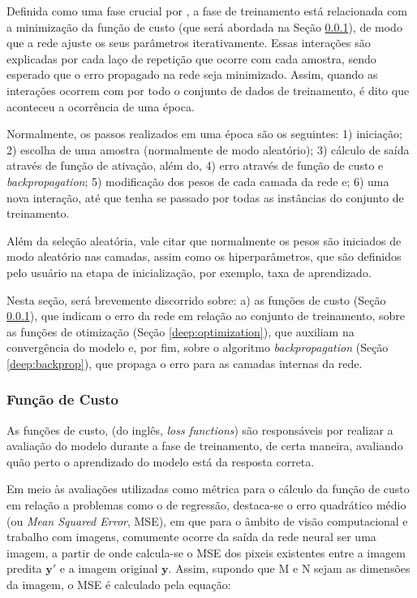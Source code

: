 Definida como uma fase crucial por \cite{ponti2018funciona}, a fase de treinamento está relacionada com a minimização da função de custo (que será abordada na Seção \ref{deep:cust}), de modo que a rede ajuste os seus parâmetros iterativamente. Essas interações são explicadas por cada laço de repetição que ocorre com cada amostra, sendo esperado que o erro propagado na rede seja minimizado. Assim, quando as interações ocorrem com por todo o conjunto de dados de treinamento, é dito que aconteceu a ocorrência de uma época.

Normalmente, os passos realizados em uma época são os seguintes: 1) iniciação; 2) escolha de uma amostra (normalmente de modo aleatório); 3) cálculo de saída através de função de ativação, além do, 4) erro através de função de custo e \textit{backpropagation}; 5) modificação dos pesos de cada camada da rede e; 6) uma nova interação, até que tenha se passado por todas as instâncias do conjunto de treinamento.

Além da seleção aleatória, vale citar que normalmente os pesos são iniciados de modo aleatório nas camadas, assim como os hiperparâmetros, que são definidos pelo usuário na etapa de inicialização, por exemplo, taxa de aprendizado.

Nesta seção, será brevemente discorrido sobre: a) as funções de custo (Seção \ref{deep:cust}), que indicam o erro da rede em relação ao conjunto de treinamento, sobre as funções de otimização (Seção \ref{deep:optimization}), que auxiliam na convergência do modelo e, por fim, sobre o algoritmo \textit{backpropagation} (Seção \ref{deep:backprop}), que propaga o erro para as camadas internas da rede.


\subsubsection{Função de Custo}
\label{deep:cust}

As funções de custo, (do inglês, \textit{loss functions}) são responsáveis por realizar a avaliação do modelo durante a fase de treinamento, de certa maneira, avaliando quão perto o aprendizado do modelo está da resposta correta.

Em meio às avaliações utilizadas como métrica para o cálculo da função de custo em relação a problemas como o de regressão, destaca-se o erro quadrático médio (ou \textit{Mean Squared Error}, MSE)\cite{Wang2004}, em que para o âmbito de visão computacional e trabalho com imagens, comumente ocorre da saída da rede neural ser uma imagem, a partir de onde calcula-se o MSE dos pixeis existentes entre a imagem predita $\boldsymbol{y'}$ e a imagem original $\boldsymbol{y}$. Assim, supondo que M e N sejam as dimensões da imagem, o MSE é calculado pela equação:

